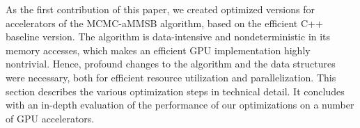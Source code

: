 
As the first contribution of this paper, we created optimized versions for
accelerators of the MCMC-aMMSB
algorithm, based on the efficient C++ baseline version.
The algorithm is data-intensive and nondeterministic in its memory accesses,
which makes an efficient GPU implementation highly nontrivial. Hence, profound
changes to the algorithm and the data structures were necessary,
both for efficient resource utilization and parallelization.
This section describes the various optimization steps in technical detail.
It concludes with an in-depth evaluation of the performance
of our optimizations on a number of GPU accelerators.

% 


